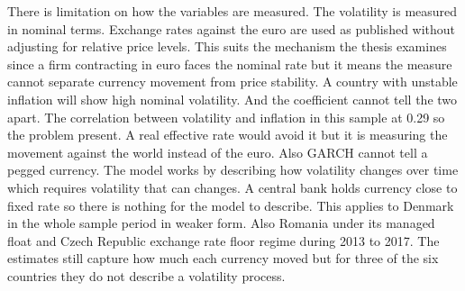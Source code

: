 \vspace{\baselineskip}

There is limitation on how the variables are measured.
The volatility is measured in nominal terms.
Exchange rates against the euro are used as published without adjusting for relative price levels.
This suits the mechanism the thesis examines since a firm contracting in euro faces the nominal rate but it means the measure cannot separate currency movement from price stability.
A country with unstable inflation will show high nominal volatility.
And the coefficient cannot tell the two apart.
The correlation between volatility and inflation in this sample at 0.29 so the problem present.
A real effective rate would avoid it but it is measuring the movement against the world instead of the euro.
Also GARCH cannot tell a pegged currency.
The model works by describing how volatility changes over time which requires volatility that can changes.
A central bank holds currency close to fixed rate so there is nothing for the model to describe.
This applies to Denmark in the whole sample period in weaker form.
Also Romania under its managed float and Czech Republic exchange rate floor regime during 2013 to 2017.
The estimates still capture how much each currency moved but for three of the six countries they do not describe a volatility process.
